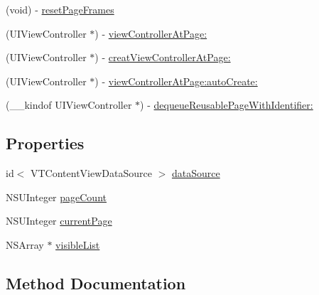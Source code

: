 \begin{DoxyCompactItemize}
\item 
(void) -\/ \mbox{\hyperlink{interface_v_t_content_view_aaf3cbce1763c957d35ebd7e44fb08abf}{reset\+Page\+Frames}}
\item 
(U\+I\+View\+Controller $\ast$) -\/ \mbox{\hyperlink{interface_v_t_content_view_ae81362c80f8f700ad3c69d814da4ca9b}{view\+Controller\+At\+Page\+:}}
\item 
(U\+I\+View\+Controller $\ast$) -\/ \mbox{\hyperlink{interface_v_t_content_view_a40b4f2a5c2a8d8ff7f2ba3ef4e8e9600}{creat\+View\+Controller\+At\+Page\+:}}
\item 
(U\+I\+View\+Controller $\ast$) -\/ \mbox{\hyperlink{interface_v_t_content_view_a688090ca86d8df39124c8720eb72e496}{view\+Controller\+At\+Page\+:auto\+Create\+:}}
\item 
(\+\_\+\+\_\+kindof U\+I\+View\+Controller $\ast$) -\/ \mbox{\hyperlink{interface_v_t_content_view_a81541fa49650eb0f8aa1ddca90798247}{dequeue\+Reusable\+Page\+With\+Identifier\+:}}
\end{DoxyCompactItemize}
\subsection*{Properties}
\begin{DoxyCompactItemize}
\item 
id$<$ V\+T\+Content\+View\+Data\+Source $>$ \mbox{\hyperlink{interface_v_t_content_view_afc7b80ec9f8d5535075fd49c9a6418b7}{data\+Source}}
\item 
N\+S\+U\+Integer \mbox{\hyperlink{interface_v_t_content_view_a7b78106bc3c803138d0b0470717b4c31}{page\+Count}}
\item 
N\+S\+U\+Integer \mbox{\hyperlink{interface_v_t_content_view_a4d0fedfb357e71a397741884ebecd702}{current\+Page}}
\item 
N\+S\+Array $\ast$ \mbox{\hyperlink{interface_v_t_content_view_af9c2b1000672aa1ebbe7d145d5b56729}{visible\+List}}
\end{DoxyCompactItemize}


\subsection{Method Documentation}
\mbox{\label{interface_v_t_content_view_a40b4f2a5c2a8d8ff7f2ba3ef4e8e9600}} 
